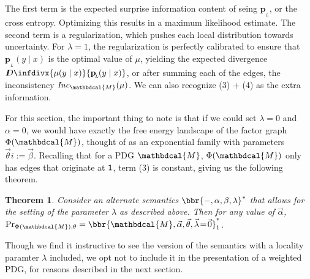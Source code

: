 \documentclass{article}
\theoremstyle{plain}
\newtheorem{theorem}{Theorem}[section]
\theoremstyle{definition}
\theoremstyle{remark}
\newcommand{\thickD}{I\mkern-8muD}
\newcommand{\kldiv}{\thickD\infdivx}
\newcommand\mat[1]{\mathbf{#1}}
\newcommand{\bp}[1][L]{\mat{p}_{\!_{#1}\!}}
\newcommand{\dg}[1]{\mathbdcal{#1}}
\newcommand\Inc{\mathit{Inc}}
\numberwithin{equation}{section}
\begin{document}
The first term is the expected surprise information content of seing $\bp$, or the cross entropy. Optimizing this results in a maximum likelihood estimate. The second term is a regularization, which pushes each local distribution towards uncertainty. For $\lambda = 1$, the regularization is perfectly calibrated to ensure that $\bp(y \mid x)$ is the optimal value of $\mu$, yielding the expected divergence $\kldiv{\mu(y\mid x)}{\bp(y\mid x)}$, or after summing each of the edges, the inconsistency $\Inc_{\dg M}( \mu)$. We can also recognize (3) + (4) as the extra information.

For this section, the important thing to note is that if we could set $\lambda = 0$ and $\alpha = 0$, we would have exactly the free energy landscape of the factor graph $\Phi(\dg M)$, thought of as an exponential family with parameters $\vec \theta i:= \vec \beta$. Recalling that for a PDG $\dg M$, $\Phi(\dg M)$ only has edges that originate at $\sf 1$, term (3) is constant, giving us the following theorem.

\begin{theorem}
	Consider an alternate semantics $\bbr{-, \alpha, \beta, \lambda}^*$ that allows for the setting of the parameter $\lambda$ as described above. Then for any value of $\vec\alpha$, $\Pr_{\Phi(\dg M),\theta} = \bbr{\dg M, \vec{\alpha}, \vec{\theta}, \vec\lambda \!=\! \vec 0 }^*_1$.
\end{theorem}

Though we find it instructive to see the version of the semantics with a locality paramter $\lambda$ included, we opt not to include it in the presentation of a weighted PDG, for reasons described in the next section.
\end{document}
